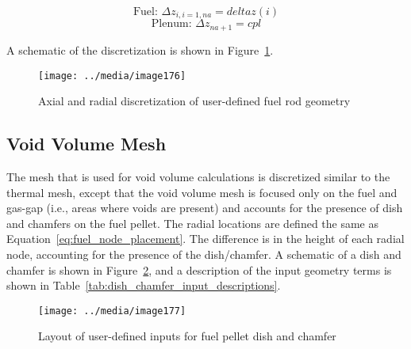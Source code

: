 \begin{equation}
    \label{eq:axial_node_length_variable_spacing_fuel}
    \text{Fuel: } \Delta z_{i,i=1,na} = deltaz\left(i\right)
\end{equation}
\begin{equation}
    \label{eq:axial_node_length_variable_spacing_plenum}
    \text{Plenum: } \Delta z_{na+1} =  cpl
\end{equation}


A schematic of the discretization is shown in Figure~\ref{fig:2d_cylindrical_geometry}.

\begin{figure}
    \texttt{[image: ../media/image176]}
    \caption{Axial and radial discretization of user-defined fuel rod geometry}
    \label{fig:2d_cylindrical_geometry}
\end{figure}
\subsection{Void Volume Mesh} \label{section:void-volume-mesh}
The mesh that is used for void volume calculations is discretized similar to the thermal mesh,
except that the void volume mesh is focused only on the fuel and gas-gap (i.e., areas where voids
are present) and accounts for the presence of dish and chamfers on the fuel pellet. The radial
locations are defined the same as Equation~\ref{eq:fuel_node_placement}. The difference is in the
height of each radial node, accounting for the presence of the dish/chamfer. A schematic of a dish
and chamfer is shown in Figure~\ref{fig:dish-and-chamfer}, and a description of the input geometry
terms is shown in Table~\ref{tab:dish_chamfer_input_descriptions}.

\begin{figure}
    \texttt{[image: ../media/image177]}
    \caption{Layout of user-defined inputs for fuel pellet dish and chamfer}
    \label{fig:dish-and-chamfer}
\end{figure}

